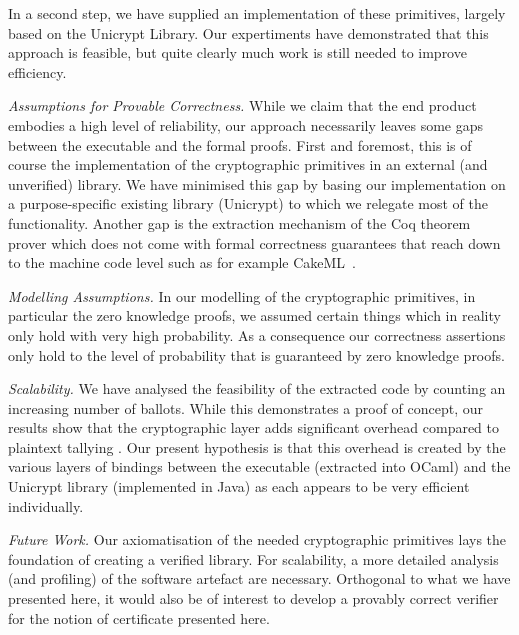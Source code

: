 \documentclass{llncs}
\begin{document}
In a second step, we have supplied an implementation of these
primitives, largely based on the Unicrypt Library. Our expertiments
have demonstrated that this approach is feasible, but quite clearly
much work is still needed to improve efficiency. 

\smallskip\noindent\emph{Assumptions for Provable Correctness.}
While we claim that the end product embodies a high level of
reliability, our approach necessarily leaves some gaps between the
executable and the formal proofs. First and foremost, this is of
course the implementation of the cryptographic primitives in an
external (and unverified) library. We have minimised this gap by
basing our implementation on a purpose-specific existing library
(Unicrypt) to which we relegate most of the functionality. Another
gap is the extraction mechanism of the Coq theorem prover which does
not come with formal correctness guarantees that reach down to the
machine code level such as for example CakeML~\cite{Kumar:2014:CVI}.

\smallskip\noindent\emph{Modelling Assumptions.} In our modelling of
the cryptographic primitives, in particular the zero knowledge
proofs, we assumed certain things which in reality only hold with
very high probability. As a
consequence our correctness assertions only hold to the level
of probability that is guaranteed by zero knowledge proofs.

\smallskip\noindent\emph{Scalability.} We have analysed the
feasibility of the extracted code by counting an increasing number
of ballots. While this demonstrates a proof of concept, our results
show that the cryptographic layer adds significant overhead compared
to plaintext tallying \cite{Pattinson:2017:SVE}.  Our present
hypothesis is that this overhead is created by the various layers of
bindings between the executable (extracted into OCaml) and the
Unicrypt library (implemented in Java) as each appears to be very
efficient individually. 

\smallskip\noindent\emph{Future Work.} Our axiomatisation of the
needed cryptographic primitives lays the foundation of creating a
verified library. For scalability, a more detailed analysis (and
profiling) of the software artefact are necessary. Orthogonal to
what we have presented here, it would also be of interest to develop
a provably correct verifier for the notion of certificate presented
here. 




%

%
%
\end{document}
